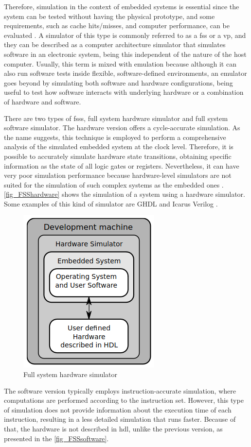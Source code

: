 Therefore, simulation in the context of embedded systems is essential since the system can be tested without having the physical prototype, and 
some requirements, such as cache hits/misses, and computer performance, can be evaluated \cite{pargem5}. A simulator of this type is commonly 
referred to as a \acrfull{fss} or a \acrfull{vp}, and they can be described as a computer architecture simulator that simulates software in an 
electronic system, being this independent of the nature of the host computer. Usually, this term is mixed with emulation because although it 
can also run software tests inside flexible, software-defined environments, an emulator goes beyond by simulating both software and hardware 
configurations, being useful to test how software interacts with underlying hardware or a combination of hardware and software.

There are two types of \glspl{fss}, full system hardware simulator and full system software simulator. The hardware version offers a 
cycle-accurate simulation. As the name suggests, this technique is employed to perform a comprehensive analysis of the simulated embedded system 
at the clock level. Therefore, it is possible to accurately simulate hardware state transitions, obtaining specific information as the state of 
all logic gates or registers. Nevertheless, it can have very poor simulation performance because hardware-level simulators are not suited for 
the simulation of such complex systems as the embedded ones \cite{TypesOfFSS}. \autoref{fig_FSShardware} shows the simulation of a system using 
a hardware simulator. Some examples of this kind of simulator are GHDL \cite{GHDLMainHomePage} and Icarus Verilog \cite{williams2002icarus}.

\begin{figure}[H]
	\centering
 	\includegraphics[width=0.3\linewidth]{Images/FSShardware.png}
 	\caption{Full system hardware simulator \cite{TypesOfFSS}}
	 \label{fig_FSShardware}
\end{figure}

The software version typically employs instruction-accurate simulation, where computations are performed according to the instruction set. 
However, this type of simulation does not provide information about the execution time of each instruction, resulting in a less detailed simulation 
that runs faster. Because of that, the hardware is not described in \gls{hdl}, unlike the previous version, as presented in the 
\autoref{fig_FSSsoftware}.

